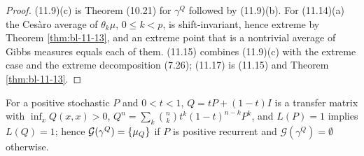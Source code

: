 \begin{proof}
    \leanok
    (11.9)(c) is Theorem (10.21) for $\gamma^Q$ followed by (11.9)(b). For (11.14)(a) the Cesàro
    average of $\theta_k\mu$, $0 \leq k < p$, is shift-invariant, hence extreme by Theorem
    \ref{thm:bl-11-13}, and an extreme point that is a nontrivial average of Gibbs measures equals
    each of them. (11.15) combines (11.9)(c) with the extreme case and the extreme decomposition
    (7.26); (11.17) is (11.15) and Theorem \ref{thm:bl-11-13}.
\end{proof}

\begin{remark}[Georgii (11.18)(1),(3)]
    \label{rmk:bl-11-18}
    \leanok

    For a positive stochastic $P$ and $0 < t < 1$, $Q = tP + (1-t)I$ is a transfer matrix with
    $\inf_x Q(x,x) > 0$, $Q^n = \sum_k \binom nk t^k(1-t)^{n-k}P^k$, and $L(P) = 1$ implies
    $L(Q) = 1$; hence $\mathcal G(\gamma^Q) = \left\{ \mu_Q \right\}$ if $P$ is positive recurrent and
    $\mathcal G(\gamma^Q) = \emptyset$ otherwise.
\end{remark}

